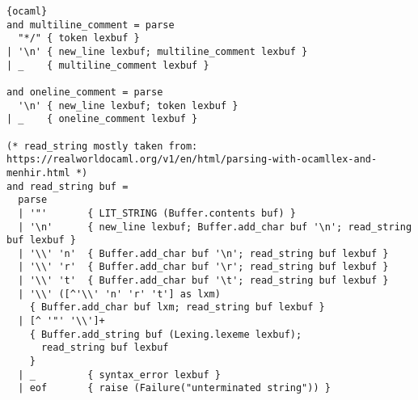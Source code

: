 \begin{lstlisting}{ocaml}
and multiline_comment = parse
  "*/" { token lexbuf }
| '\n' { new_line lexbuf; multiline_comment lexbuf }
| _    { multiline_comment lexbuf }

and oneline_comment = parse
  '\n' { new_line lexbuf; token lexbuf }
| _    { oneline_comment lexbuf }

(* read_string mostly taken from:
https://realworldocaml.org/v1/en/html/parsing-with-ocamllex-and-menhir.html *)
and read_string buf =
  parse
  | '"'       { LIT_STRING (Buffer.contents buf) }
  | '\n'      { new_line lexbuf; Buffer.add_char buf '\n'; read_string buf lexbuf }
  | '\\' 'n'  { Buffer.add_char buf '\n'; read_string buf lexbuf }
  | '\\' 'r'  { Buffer.add_char buf '\r'; read_string buf lexbuf }
  | '\\' 't'  { Buffer.add_char buf '\t'; read_string buf lexbuf }
  | '\\' ([^'\\' 'n' 'r' 't'] as lxm)
    { Buffer.add_char buf lxm; read_string buf lexbuf }
  | [^ '"' '\\']+
    { Buffer.add_string buf (Lexing.lexeme lexbuf);
      read_string buf lexbuf
    }
  | _         { syntax_error lexbuf }
  | eof       { raise (Failure("unterminated string")) }
\end{lstlisting}
